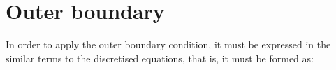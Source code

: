 \documentclass[11pt]{amsart}
\begin{document}

\section{Outer boundary}

In order to apply the outer boundary condition, it must be expressed in the similar terms to the discretised equations, that is, it must be formed as:
\end{document}
